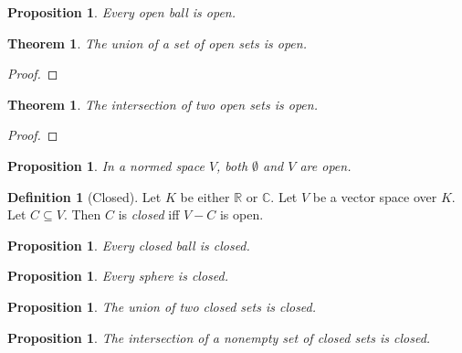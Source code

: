 \documentclass{book}
\let\qed\relax
\newtheorem{prop}[ax]{Proposition}
\newtheorem{thm}[ax]{Theorem}
\theoremstyle{definition}
\newtheorem{df}[ax]{Definition}
\begin{document}
\begin{prop}
Every open ball is open.
\end{prop}

\begin{thm}
The union of a set of open sets is open.
\end{thm}

\begin{proof}
\pf
{}
\qed
\end{proof}

\begin{thm}
The intersection of two open sets is open.
\end{thm}

\begin{proof}
\pf
{}
\qed
\end{proof}

\begin{prop}
In a normed space $V$, both $\emptyset$ and $V$ are open.
\end{prop}

\begin{df}[Closed]
Let $K$ be either $\mathbb{R}$ or $\mathbb{C}$. Let $V$ be a vector space over $K$. Let $C \subseteq V$. Then $C$ is \emph{closed} iff $V - C$ is open.
\end{df}

\begin{prop}
\label{prop:closedball}
Every closed ball is closed.
\end{prop}

\begin{prop}
Every sphere is closed.
\end{prop}

\begin{prop}
The union of two closed sets is closed.
\end{prop}

\begin{prop}
The intersection of a nonempty set of closed sets is closed.
\end{prop}
\end{document}

